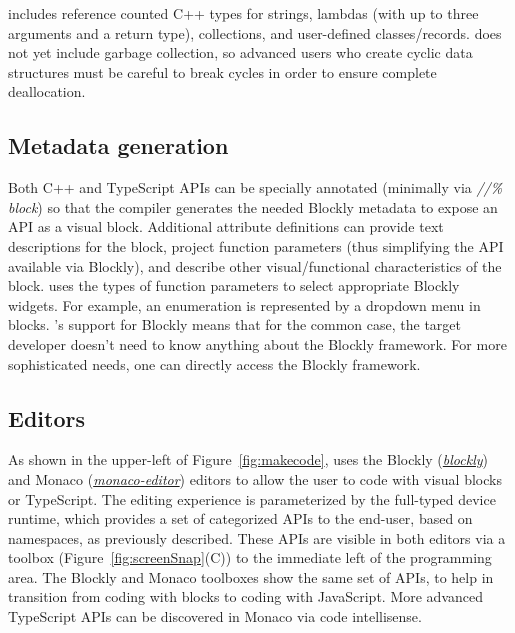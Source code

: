 
\MC includes reference counted C++ types for strings, lambdas (with
up to three arguments and a return type), collections, and user-defined classes/records.  
\MC does not yet include garbage collection, so advanced users who create cyclic
data structures must be careful to break cycles in order to ensure complete deallocation. 

\subsection{Metadata generation}

Both C++ and TypeScript APIs can be specially annotated (minimally via 
\emph{//\% block}) so that the \MC compiler generates the needed
Blockly metadata to expose an API as a visual block.
Additional attribute definitions can provide text descriptions for the block, project function
parameters (thus simplifying the API available via Blockly), and describe other visual/functional
characteristics of the block.  \MC uses the types of function parameters to select appropriate
Blockly widgets.  For example, an enumeration is represented by a dropdown menu in blocks.
\MCN's support for Blockly means that for the common case, the target developer doesn't need
to know anything about the Blockly framework.
For more sophisticated needs, one can directly access the Blockly framework. 

\subsection{Editors}

As shown in the upper-left of Figure~\ref{fig:makecode},
\MC uses the Blockly (\emph{\href{https://github.com/google/blockly}{blockly}}) and Monaco 
(\emph{\href{https://github.com/Microsoft/monaco-editor}{monaco-editor}}) editors to allow the user to code with
visual blocks or TypeScript. The editing experience is parameterized by the full-typed device
runtime, which provides a set of categorized APIs to the end-user, based on namespaces, as
previously described. These APIs are visible in both editors via a toolbox (Figure~\ref{fig:screenSnap}(C))
to the immediate
left of the programming area. The Blockly and Monaco toolboxes show the same set of APIs, to
help in transition from coding with blocks to coding with JavaScript. More advanced TypeScript
APIs can be discovered in Monaco via code intellisense.

